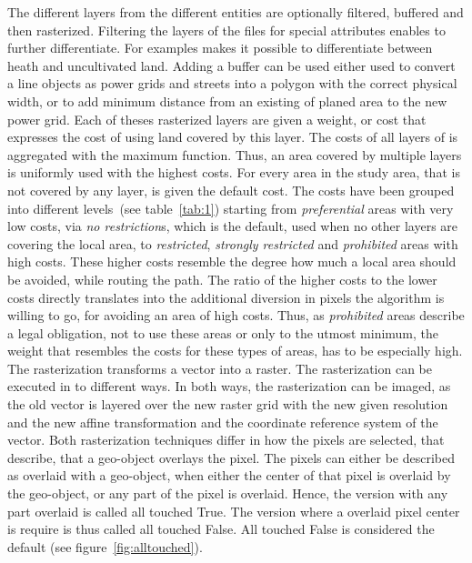 The different layers from the different entities are optionally filtered, buffered and then rasterized.
Filtering the layers of the files for special attributes enables to further differentiate.
For examples makes it possible to differentiate between heath and uncultivated land.
Adding a buffer can be used either used to convert a line objects as power grids and streets into a polygon with the
correct physical width, or to add minimum distance from an existing of planed area to the new power grid.
Each of theses rasterized layers are given a weight, or cost that expresses the cost of using land covered by this layer.
The costs of all layers of is aggregated with the maximum function.
Thus, an area covered by multiple layers is uniformly used with the highest costs.
For every area in the study area, that is not covered by any layer, is given the default cost.
The costs have been grouped into different levels~(see table~\ref{tab:1}) starting from \textit{preferential} areas with
very low costs, via \textit{no restriction}s, which is the default, used when no other layers are covering the local area,
to \textit{restricted}, \textit{strongly restricted} and \textit{prohibited} areas with high costs.
These higher costs resemble the degree how much a local area should be avoided, while routing the path.
The ratio of the higher costs to the lower costs directly translates into the additional diversion in pixels
the algorithm is willing to go, for avoiding an area of high costs.
Thus, as \textit{prohibited} areas describe a legal obligation, not to use these areas or only to the utmost minimum,
the weight that resembles the costs for these types of areas, has to be especially high. \\
The rasterization transforms a vector into a raster.
The rasterization can be executed in to different ways.
In both ways, the rasterization can be imaged, as the old vector is layered over the new raster grid with the new
given resolution and the new affine transformation and the coordinate reference system of the vector.
Both rasterization techniques differ in how the pixels are selected, that describe, that a geo-object overlays the pixel.
The pixels can either be described as overlaid with a geo-object, when either the center of that pixel is overlaid
by the geo-object, or any part of the pixel is overlaid.
Hence, the version with any part overlaid is called all touched True.
The version where a overlaid pixel center is require is thus called all touched False.
All touched False is considered the default (see figure~\ref{fig:alltouched}).
